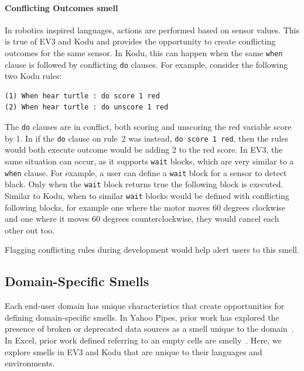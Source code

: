 \documentclass[conference]{IEEEtran}
\begin{document}
\paragraph{Conflicting Outcomes smell}
In robotics inspired languages, actions are performed based on sensor values. This is true of EV3 and Kodu and  provides the opportunity to create conflicting outcomes for the same sensor. 
In Kodu, this can happen when the same \texttt{when} clause is followed by conflicting \texttt{do} clauses. For example, consider the following two Kodu rules:
\begin{verbatim}
(1) When hear turtle : do score 1 red
(2) When hear turtle : do unscore 1 red
\end{verbatim}
\noindent The {\tt do} clauses are in conflict, both scoring and unscoring the red variable score by 1. In if the {\tt do} clause on rule~2 was instead, {\tt do score 1 red}, then the rules would both execute outcome would be adding 2 to the red score. 
In EV3, the same situation can occur, as it supports \texttt{wait} blocks, which are very similar to a \texttt{when} clause. For example, a user can define a \texttt{wait} block for a sensor to detect black. Only when the \texttt{wait} block returns true the following block is executed. Similar to Kodu, when to similar \texttt{wait} blocks would be defined with conflicting following blocks, for example one where the motor moves 60 degrees clockwise and one where it moves 60 degrees counterclockwise, they would cancel each other out too.

Flagging conflicting rules during development would help alert users to this smell. 

\subsection{Domain-Specific Smells}
Each end-user domain has unique characteristics that create opportunities for defining domain-specific smells. In Yahoo Pipes, prior work has explored the presence of broken or deprecated data sources as a smell unique to the domain~\cite{StoleeTSE2013}. In Excel, prior work defined referring to an empty cells are smelly~\cite{cunha2012towards}. Here, we explore smells in EV3 and Kodu that are unique to their languages and environments. 
\end{document}
